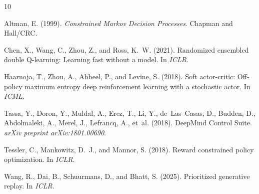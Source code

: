 \documentclass[11pt]{article}
\begin{document}

\begin{thebibliography}{10}

Altman, E. (1999).
\newblock \emph{Constrained Markov Decision Processes}.
\newblock Chapman and Hall/CRC.

Chen, X., Wang, C., Zhou, Z., and Ross, K.~W. (2021).
\newblock Randomized ensembled double Q-learning: Learning fast without a model.
\newblock In \emph{ICLR}.

Haarnoja, T., Zhou, A., Abbeel, P., and Levine, S. (2018).
\newblock Soft actor-critic: Off-policy maximum entropy deep reinforcement learning with a stochastic actor.
\newblock In \emph{ICML}.

Tassa, Y., Doron, Y., Muldal, A., Erez, T., Li, Y., de~Las~Casas, D., Budden, D., Abdolmaleki, A., Merel, J., Lefrancq, A., et~al. (2018).
\newblock DeepMind Control Suite.
\newblock \emph{arXiv preprint arXiv:1801.00690}.

Tessler, C., Mankowitz, D.~J., and Mannor, S. (2018).
\newblock Reward constrained policy optimization.
\newblock In \emph{ICLR}.

Wang, R., Dai, B., Schuurmans, D., and Bhatt, S. (2025).
\newblock Prioritized generative replay.
\newblock In \emph{ICLR}.

\end{thebibliography}
\end{document}
